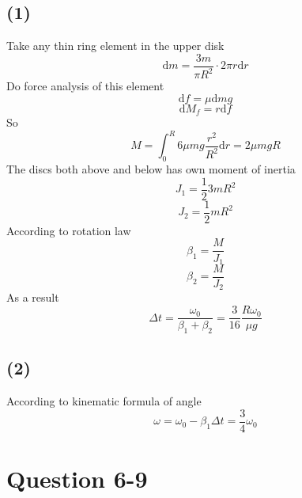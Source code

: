 \documentclass[12pt,a4paper]{article}%
\begin{document}
	\subsection*{(1)}
	\noindent Take any thin ring element in the upper disk
	\begin{equation}
		\mathrm{d}m=\frac{3m}{\pi R^2}\cdot2\pi r \mathrm{d}r
	\end{equation}
	Do force analysis of this element
	\begin{equation}
		\mathrm{d}f=\mu \mathrm{d}mg
	\end{equation}
	\begin{equation}
		\mathrm{d}M_f=r\mathrm{d}f
	\end{equation}
	So
	\begin{equation}
		M=\int_0^R{6\mu mg\frac{r^2}{R^2}\mathrm{d}r}=2\mu mgR
	\end{equation}
	The discs both above and below has own moment of inertia
	\begin{equation}
		J_1=\frac{1}{2}3mR^2
	\end{equation}
	\begin{equation}
		J_2=\frac{1}{2}mR^2
	\end{equation}
	According to rotation law
	\begin{equation}
		\beta _1=\frac{M}{J_1}
	\end{equation}
	\begin{equation}
		\beta _2=\frac{M}{J_2}
	\end{equation}
	As a result
	\begin{equation*}
		\Delta t=\frac{\omega_0}{\beta_1+\beta_2}=\frac{3}{16}\frac{R\omega_0}{\mu g}
	\end{equation*}
	\subsection*{(2)}
	\noindent According to kinematic formula of angle
	\begin{equation*}
		\omega=\omega_0-\beta_1\Delta t=\frac{3}{4}\omega_0
	\end{equation*}
	
	\section{Question 6-9}
\end{document}
